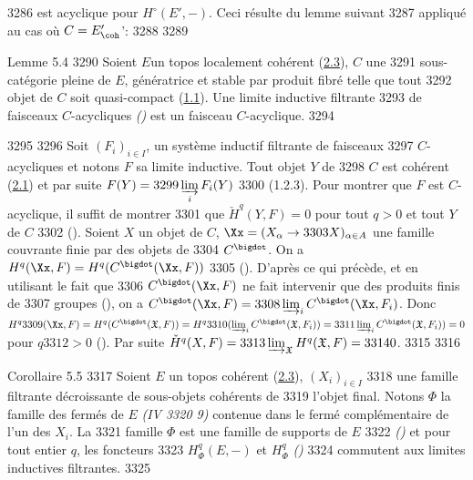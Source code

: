   3286	est acyclique pour $H^{\circ} (E', -)$. Ceci résulte du lemme suivant
  3287	appliqué au cas où $C = E'_{\coh}$':
  3288	
  3289	\begin{enonce*}{Lemme 5.4}
  3290	Soient $E$\pageoriginale un topos localement cohérent (\hyperref[VI.def2.3]{2.3}), $C$ une
  3291	sous-catégorie pleine de $E$, génératrice et stable par produit fibré telle que tout
  3292	objet de $C$ soit quasi-compact (\hyperref[VI.def1.1]{1.1}). Une limite inductive filtrante
  3293	de faisceaux $C$-acycliques \emph{()} est un faisceau $C$-acyclique.
  3294	\end{enonce*}
  3295	
  3296	Soit $(F_i)_{i \in I}$, un système inductif filtrante de faisceaux
  3297	$C$-acycliques et notons $F$ sa limite inductive. Tout objet $Y$ de
  3298	$C$ est cohérent (\hyperref[VI.prop2.1]{2.1}) et par suite $F(Y) =
  3299	\displaystyle\mathop{\varinjlim}_i F_i (Y)$
  3300	(1.2.3). Pour montrer que $F$ est $C$-acyclique, il suffit de montrer
  3301	que $\check{H}^{q} (Y, F) = 0$ pour tout $q > 0$ et tout $Y$ de $C$
  3302	(). Soient $X$ un objet de $C$, $\Xx = (X_{\alpha} \to
  3303	X)_{\alpha \in A}$ une famille couvrante finie par des objets de
  3304	$C^{\bigdot}$. On a $H^{q} (\Xx, F) = H^q (C^{\bigdot}(\Xx, F))$
  3305	(). D'après ce qui précède, et en utilisant le fait que
  3306	$C^{\bigdot}(\Xx, F)$ ne fait intervenir que des produits finis de
  3307	groupes (), on a $C^{\bigdot}(\Xx, F) =
  3308	\varinjlim_i C^{\bigdot}(\Xx, F_i)$. Donc $H^q
  3309	(\Xx, F) = H^q (C^{\bigdot}(\mathfrak{X}, F)) = H^q
  3310	(\varinjlim_i C^{\bigdot}(\mathfrak{X}, F_i)) =
  3311	\varinjlim_i C^{\bigdot}(\mathfrak{X}, F_i)) = 0$ pour $q
  3312	> 0$ (). Par suite $\check{H}^q (X, F) =
  3313	\varinjlim_{\mathfrak{X}}  H^q (\mathfrak{X}, F) =
  3314	0$.
  3315	
  3316	\begin{enonce*}{Corollaire 5.5}
  3317	Soient $E$ un topos cohérent (\hyperref[VI.def2.3]{2.3}), ${(X_i)_{i \in I}}$
  3318	une famille filtrante décroissante de sous-objets cohérents de
  3319	l'objet final. Notons $\Phi$ la famille des fermés de $E$ \emph{(IV
  3320	9)} contenue dans le fermé complémentaire de l'un des $X_i$. La
  3321	famille $\Phi$ est une famille de supports de $E$
  3322	\emph{()} et pour tout entier $q$, les foncteurs
  3323	$H^q_{\Phi} (E, -)$ et $H^q_{\Phi}$ \emph{()}
  3324	commutent aux limites inductives filtrantes.
  3325	\end{enonce*}
